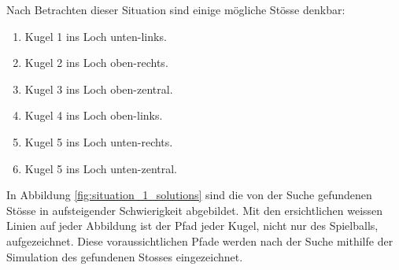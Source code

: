 Nach Betrachten dieser Situation sind einige mögliche Stösse denkbar:
\begin{enumerate}
    \item Kugel 1 ins Loch unten-links.
    \item Kugel 2 ins Loch oben-rechts.
    \item Kugel 3 ins Loch oben-zentral.
    \item Kugel 4 ins Loch oben-links.
    \item Kugel 5 ins Loch unten-rechts.
    \item Kugel 5 ins Loch unten-zentral.
\end{enumerate}

In Abbildung \ref{fig:situation_1_solutions} sind die von der Suche gefundenen Stösse in aufsteigender Schwierigkeit abgebildet.
Mit den ersichtlichen weissen Linien auf jeder Abbildung ist der Pfad jeder Kugel, nicht nur des Spielballs, aufgezeichnet.
Diese voraussichtlichen Pfade werden nach der Suche mithilfe der Simulation des gefundenen Stosses eingezeichnet.

